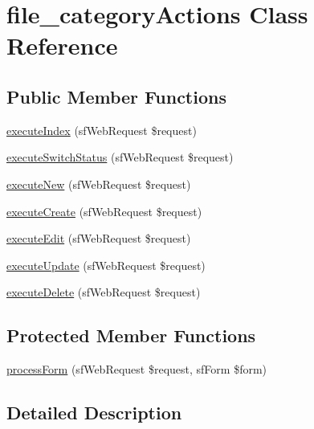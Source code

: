 \hypertarget{classfile__category_actions}{\section{file\-\_\-category\-Actions Class Reference}
\label{classfile__category_actions}
}
\subsection*{Public Member Functions}
\begin{DoxyCompactItemize}
\item 
\hyperlink{classfile__category_actions_a948cc911eb1d9f77990be54af3b2080f}{execute\-Index} (sf\-Web\-Request \$request)
\item 
\hyperlink{classfile__category_actions_a84f3809dd64121e2fd999bf9e0c8b2ba}{execute\-Switch\-Status} (sf\-Web\-Request \$request)
\item 
\hyperlink{classfile__category_actions_a0ffbea56560c6c633dae68ec22aff21c}{execute\-New} (sf\-Web\-Request \$request)
\item 
\hyperlink{classfile__category_actions_a75837617743fb64dca82d8133b2c662a}{execute\-Create} (sf\-Web\-Request \$request)
\item 
\hyperlink{classfile__category_actions_af4d8fedd4b28f3398826a1bb8fa54394}{execute\-Edit} (sf\-Web\-Request \$request)
\item 
\hyperlink{classfile__category_actions_af7b4f51862add3c2ebb54efc136a0840}{execute\-Update} (sf\-Web\-Request \$request)
\item 
\hyperlink{classfile__category_actions_a52b5b11b11a0070dd2662257520c045a}{execute\-Delete} (sf\-Web\-Request \$request)
\end{DoxyCompactItemize}
\subsection*{Protected Member Functions}
\begin{DoxyCompactItemize}
\item 
\hyperlink{classfile__category_actions_a7cf661d837626e0320753cbffa019a01}{process\-Form} (sf\-Web\-Request \$request, sf\-Form \$form)
\end{DoxyCompactItemize}


\subsection{Detailed Description}


